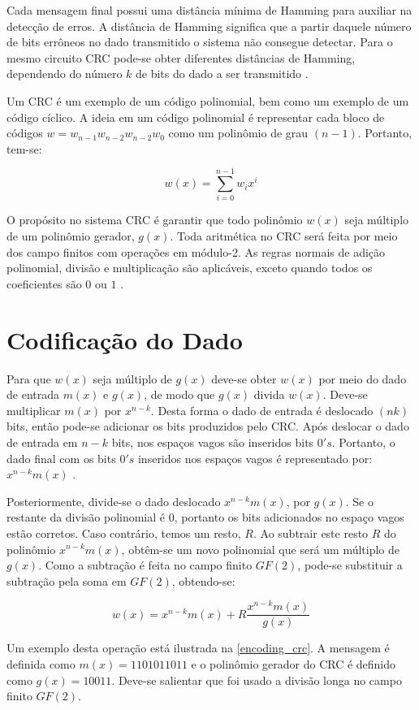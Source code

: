 Cada mensagem final possui uma distância mínima de Hamming para auxiliar na detecção de erros. A distância de Hamming significa que a partir daquele número de bits errôneos no dado transmitido o sistema não consegue detectar. Para o mesmo circuito CRC pode-se obter diferentes distâncias de Hamming, dependendo do número $k$ de bits do dado a ser transmitido \cite{Tridib2004}.	

Um CRC é um exemplo de um código polinomial, bem como um exemplo de um código cíclico. A ideia em um código polinomial é representar cada bloco de códigos $w = w_{n − 1} w_{n − 2} w_{n − 2} w_{0}$ como um polinômio de grau $(n - 1)$. Portanto, tem-se:

$$ w(x)= \sum_{i = 0}^{n - 1} w_{i}x^{i}$$

O propósito no sistema CRC é garantir que todo polinômio $w(x)$ seja múltiplo de um polinômio gerador, $g(x)$. Toda aritmética no CRC será feita por meio dos campo finitos com 
operações em módulo-2. As regras normais de adição polinomial, divisão e multiplicação são aplicáveis, exceto quando todos os coeficientes são $0$ ou $1$ \cite{Tridib2004}.

\section{Codificação do Dado}
Para que $w(x)$ seja múltiplo de $g(x)$ deve-se obter $w(x)$ por meio do dado de entrada $m(x)$ e $g(x)$, de modo que $g(x)$ divida $w(x)$. Deve-se multiplicar $m(x)$ por $x^{n − k}$. Desta forma o dado de entrada é deslocado $(n  k)$ bits, então pode-se adicionar os bits produzidos pelo CRC. Após deslocar o dado de entrada em $n - k$ bits, nos espaços vagos são inseridos bits $0's$. Portanto, o dado final com os bits $0's$ inseridos nos espaços vagos é representado por: $x^{n − k}m(x)$ \cite{Tridib2004}.

Posteriormente, divide-se o dado deslocado $x^{n − k}m(x)$, por $g(x)$. Se o restante da divisão polinomial é 0, portanto os bits adicionados no espaço vagos estão corretos. Caso contrário, temos um resto, $R$. Ao subtrair este resto $R$ do polinômio $x^{n - k}m(x)$, obtêm-se um novo polinomial que será um múltiplo de $g(x)$. Como a subtração é feita no campo finito $GF(2)$, pode-se substituir a subtração pela soma em $GF(2)$, obtendo-se:

$$ w(x) = x^{n − k}m(x) + R{\dfrac{x^{n−k}m(x)}{g(x)}} $$

Um exemplo desta operação está ilustrada na \autoref{encoding_crc}. A mensagem é definida como $m(x) = 1101011011$ e o polinômio gerador do CRC é definido como $g(x) = 10011$. Deve-se salientar que foi usado a divisão longa no campo finito $GF(2)$.

